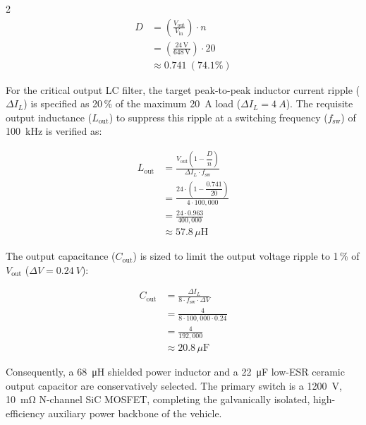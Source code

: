 \begin{multicols}{2}
\begin{equation} \label{eq:duty_cycle}
\begin{split}
D &= \left( \frac{V_{\text{out}}}{V_{\text{in}}} \right) \cdot n \\
&= \left( \frac{24\,\mathrm{V}}{648\,\mathrm{V}} \right) \cdot 20 \\
&\approx 0.741 \ (74.1\%)
\end{split}
\end{equation}

For the critical output LC filter, the target peak-to-peak inductor current ripple ($\Delta I_L$) is specified as 20\,\% of the maximum \SI{20}{A} load ($\Delta I_L = \SI{4}{A}$). The requisite output inductance ($L_{\text{out}}$) to suppress this ripple at a switching frequency ($f_{\text{sw}}$) of \SI{100}{\kilo\hertz} is verified as:

\begin{equation} \label{eq:inductor_calc}
\begin{split}
L_{\text{out}} &= \frac{V_{\text{out}} \left( 1 - \dfrac{D}{n} \right)}{\Delta I_L \cdot f_{\text{sw}}} \\
&= \frac{24 \cdot \left( 1 - \dfrac{0.741}{20} \right)}{4 \cdot 100{,}000} \\
&= \frac{24 \cdot 0.963}{400{,}000} \\
&\approx 57.8\,\mu\mathrm{H}
\end{split}
\end{equation}

The output capacitance ($C_{\text{out}}$) is sized to limit the output voltage ripple to 1\,\% of $V_{\text{out}}$ ($\Delta V = \SI{0.24}{V}$):

\begin{equation} \label{eq:capacitor_calc}
\begin{split}
C_{\text{out}} &= \frac{\Delta I_L}{8 \cdot f_{\text{sw}} \cdot \Delta V} \\
&= \frac{4}{8 \cdot 100{,}000 \cdot 0.24} \\
&= \frac{4}{192{,}000} \\
&\approx 20.8\,\mu\mathrm{F}
\end{split}
\end{equation}

Consequently, a \SI{68}{\micro\henry} shielded power inductor and a \SI{22}{\micro\farad} low-ESR ceramic output capacitor are conservatively selected. The primary switch is a \SI{1200}{V}, \SI{10}{\milli\ohm} N-channel SiC MOSFET, completing the galvanically isolated, high-efficiency auxiliary power backbone of the vehicle.


\end{multicols}
